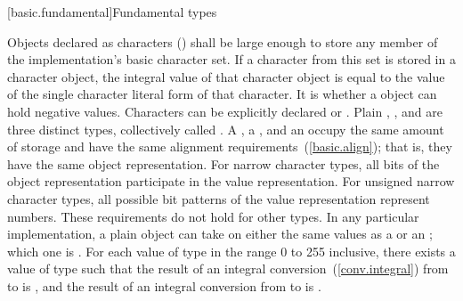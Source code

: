 [basic.fundamental]{Fundamental types}

\pnum
{}%
%
%
%
%
%
%
%
Objects declared as characters () shall be large enough to
store any member of the implementation's basic character set. If a
character from this set is stored in a character object, the integral
value of that character object is equal to the value of the single
character literal form of that character. It is 
whether a  object can hold negative values.
%
%
%
Characters can be explicitly declared  or
.
%
Plain , , and  are
three distinct types, collectively called .
A , a , and an
 occupy the same amount of storage and have the
same alignment requirements~(\ref{basic.align}); that is, they have the
same object representation. For narrow character types, all bits of the object
representation participate in the value representation. For unsigned narrow
character types, all possible bit patterns of the value representation
represent numbers. These requirements do not hold for other types. In
any particular implementation, a plain  object can take on
either the same values as a  or an ; which one is .
For each value  of type  in the range
0 to 255 inclusive, there exists a value  of type
 such that the result of an integral
conversion~(\ref{conv.integral}) from  to  is
, and the result of an integral conversion from
 to  is .

